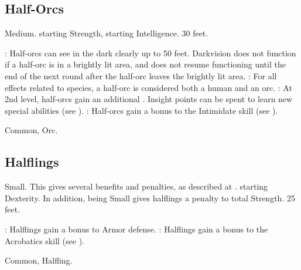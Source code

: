 \subsection{Half-Orcs}
 Medium.
  starting Strength,  starting Intelligence.
 30 feet.
\begin{itemize}
    : Half-orcs can see in the dark clearly up to 50 feet. Darkvision does not function if a half-orc is in a brightly lit area, and does not resume functioning until the end of the next round after the half-orc leaves the brightly lit area.
    : For all effects related to species, a half-orc is considered both a human and an orc.
    : At 2nd level, half-orcs gain an additional .
        Insight points can be spent to learn new special abilities (see ).
    : Half-orcs gain a  bonus to the Intimidate skill (see ).
\end{itemize}
 Common, Orc.

\subsection{Halflings}
 Small. This gives several benefits and penalties, as described at .
  starting Dexterity. In addition, being Small gives halflings a  penalty to total Strength.
 25 feet.
\begin{itemize}
    : Halflings gain a  bonus to Armor defense.
    : Halflings gain a  bonus to the Acrobatics skill (see ).
\end{itemize}
 Common, Halfling.
